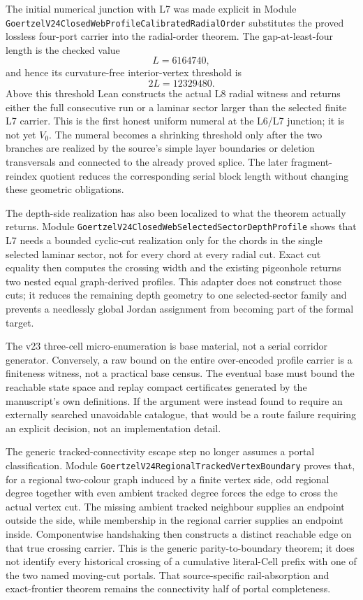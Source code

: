 \documentclass[11pt]{article}
\theoremstyle{definition}
\begin{document}
The initial numerical junction with L7 was made explicit in Module
\texttt{GoertzelV24ClosedWebProfileCalibratedRadialOrder} substitutes the
proved lossless four-port carrier into the radial-order theorem.  The
gap-at-least-four length is the checked value
\[
  L=6164740,
\]
and hence its curvature-free interior-vertex threshold is
\[
  2L=12329480.
\]
Above this threshold Lean constructs the actual L8 radial witness and returns
either the full consecutive run or a laminar sector larger than the selected
finite L7 carrier.  This is the first honest uniform numeral at the L6/L7
junction; it is not yet $V_0$.  The numeral becomes a shrinking threshold only
after the two branches are realized by the source's simple layer boundaries
or deletion transversals and connected to the already proved splice.  The
later fragment-reindex quotient reduces the corresponding serial block length
without changing these geometric obligations.

The depth-side realization has also been localized to what the theorem
actually returns.  Module
\texttt{GoertzelV24ClosedWebSelectedSectorDepthProfile} shows that L7 needs a
bounded cyclic-cut realization only for the chords in the single selected
laminar sector, not for every chord at every radial cut.  Exact cut equality
then computes the crossing width and the existing pigeonhole returns two
nested equal graph-derived profiles.  This adapter does not construct those
cuts; it reduces the remaining depth geometry to one selected-sector family
and prevents a needlessly global Jordan assignment from becoming part of the
formal target.

The v23 three-cell micro-enumeration is base material, not a serial corridor
generator.  Conversely, a raw bound on the entire over-encoded profile carrier
is a finiteness witness, not a practical base census.  The eventual base must
bound the reachable state space and replay compact certificates generated by
the manuscript's own definitions.  If the argument were instead found to
require an externally searched unavoidable catalogue, that would be a route
failure requiring an explicit decision, not an implementation detail.

The generic tracked-connectivity escape step no longer assumes a portal
classification.  Module
\texttt{GoertzelV24RegionalTrackedVertexBoundary} proves that, for a regional
two-colour graph induced by a finite vertex side, odd regional degree together
with even ambient tracked degree forces the edge to cross the actual vertex
cut.  The missing ambient tracked neighbour supplies an endpoint outside the
side, while membership in the regional carrier supplies an endpoint inside.
Componentwise handshaking then constructs a distinct reachable edge on that
true crossing carrier.  This is the generic parity-to-boundary theorem; it
does not identify every historical crossing of a cumulative literal-Cell
prefix with one of the two named moving-cut portals.  That source-specific
rail-absorption and exact-frontier theorem remains the connectivity half of
portal completeness.
\end{document}
